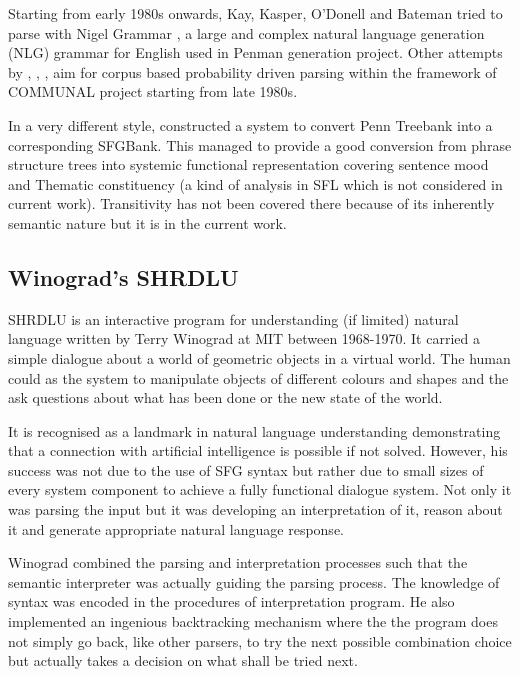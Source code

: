 Starting from early 1980s onwards, Kay, Kasper, O'Donell and Bateman tried to parse with Nigel Grammar \citep{Matthiessen1985}, a large and complex natural language generation (NLG) grammar for English used in Penman generation project. Other attempts by \citet{ODonoghue1991a}, \citet{Weerasinghe1994}, \citet{Souter1996}, \citet{Day2007} aim for corpus based probability driven parsing within the framework of COMMUNAL project starting from late 1980s.

In a very different style, \citet{Honnibal2004a,Honnibal2007} constructed a system to convert Penn Treebank into a corresponding SFGBank. This managed to provide a good conversion from phrase structure trees into systemic functional representation covering sentence mood and Thematic constituency (a kind of analysis in SFL which is not considered in current work). Transitivity has not been covered there because of its inherently semantic nature but it is in the current work.

\subsection{Winograd's SHRDLU}
SHRDLU is an interactive program for understanding (if limited) natural language written by Terry Winograd at MIT between 1968-1970. It carried a simple dialogue about a world of geometric objects in a virtual world. The human could as the system to manipulate objects of different colours and shapes and the ask questions about what has been done or the new state of the world. 

It is recognised as a landmark in natural language understanding demonstrating that a connection with artificial intelligence is possible if not solved. However, his success was not due to the use of SFG syntax but rather due to small sizes of every system component to achieve a fully functional dialogue system. Not only it was parsing the input but it was developing an interpretation of it, reason about it and generate appropriate natural language response. 

Winograd combined the parsing and interpretation processes such that the semantic interpreter was actually guiding the parsing process. The knowledge of syntax was encoded in the procedures of interpretation program. He also implemented an ingenious backtracking mechanism where the the program does not simply go back, like other parsers, to try the next possible combination choice but actually takes a decision on what shall be tried next.  

